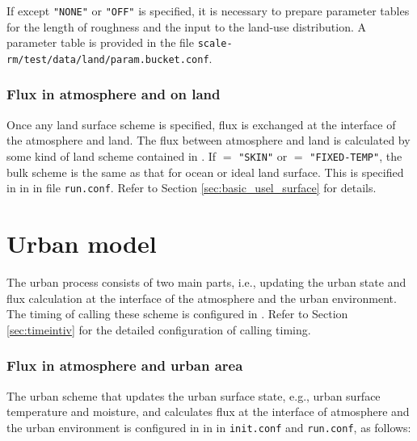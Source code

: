 If  except \verb|"NONE"| or \verb|"OFF"| is specified,
it is necessary to prepare parameter tables for the length of roughness and the input to the land-use distribution.
A parameter table is provided
in the file \verb|scale-rm/test/data/land/param.bucket.conf|.\\


\subsubsection{Flux in atmosphere and on land}
Once any land surface scheme is specified, flux is exchanged at the interface of the atmosphere and land. The flux between atmosphere and land is calculated by some kind of land scheme contained in \scalerm. If  $=$ \verb|"SKIN"| or  $=$ \verb|"FIXED-TEMP"|, the bulk scheme is the same as that for ocean or ideal land surface. This is specified in  in  in file \verb|run.conf|. Refer to Section \ref{sec:basic_usel_surface} for details.

\section{Urban model} \label{sec:basic_usel_urban}
The urban process consists of two main parts, i.e., updating the urban state and flux calculation at the interface of the atmosphere and the urban environment. The timing of calling these scheme is configured in . Refer to Section \ref{sec:timeintiv} for the detailed configuration of calling timing.

\subsubsection{Flux in atmosphere and urban area}

The urban scheme that updates the urban surface state, e.g., urban surface temperature and moisture, and calculates flux at the interface of atmosphere and the urban environment is configured in  in  in \verb|init.conf| and \verb|run.conf|, as follows:

